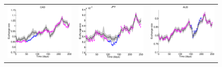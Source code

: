 \begin{figure}
\centering
\begin{tabular}{ccc}
\includegraphics[scale=0.3]{figures/fxCAD.eps} &
\includegraphics[scale=0.3]{figures/fxJPY.eps} &
\includegraphics[scale=0.3]{figures/fxAUD.eps}

\end{tabular}
\end{figure}
